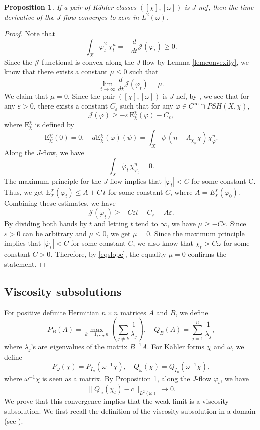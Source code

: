\documentclass{amsart}
\numberwithin{equation}{section}
\theoremstyle{plain}
\newtheorem{prop}[equation]{Proposition}
\theoremstyle{definition}
\theoremstyle{remark}
\begin{document}
\begin{prop}\label{propslope}
    If a pair of K{\"a}hler classes $([\chi],[\omega])$ is $J$-nef, then the time derivative of the $J$-flow converges to zero in $L^2(\omega)$.
\end{prop}
\begin{proof}
    Note that 
    \begin{equation}\label{eqslope}
        \int_X \dot{\varphi}_t^2 \, \chi_t^n= -\frac{d}{dt}\mathcal{J} (\varphi_t) \ge 0.
    \end{equation}
    Since the $\mathcal{J}$-functional is convex along the $J$-flow by Lemma \ref{lemconvexity}, we know that there exists a constant $\mu \le 0$ such that
    $$\lim_{t\rightarrow\infty}\frac{d}{dt}\mathcal{J}(\varphi_t) = \mu.$$
    We claim that $\mu =0.$ Since the pair $([\chi],[\omega])$ is $J$-nef, by \cite[Theorem 23]{SD}, we see that for any $\varepsilon>0$, there exists a constant $C_\varepsilon$ such that for any $\varphi \in C^\infty \cap PSH(X,\chi)$,
    $$\mathcal{J} (\varphi) \ge -\varepsilon \, \mathrm{E}^\chi_\chi(\varphi) - C_\varepsilon,$$
    where $\mathrm{E}^\chi_\chi$ is defined by
    $$\mathrm{E}^\chi_\chi(0)=0,\quad d\mathrm{E}^\chi_\chi(\varphi)(\psi)=\int_X \psi \, (n-\Lambda_{\chi_\varphi}\chi) \chi_\varphi^n.$$
    Along the $J$-flow, we have
    $$\int_X \dot{\varphi}_t \, \chi_{\varphi_t}^n=0.$$ 
    The maximum principle for the $J$-flow implies that
    $|\dot{\varphi}_t| < C$ 
    for some constant C. 
    Thus, we get
    $\mathrm{E}^\chi_\chi(\varphi_t) \le A+C \, t$ 
    for some constant $C$, where $A=E^\chi_\chi(\varphi_0)$.
    Combining these estimates, we have
    $$\mathcal{J}(\varphi_t) \ge - C \varepsilon t - C_\varepsilon-A\varepsilon.$$
    By dividing both hands by $t$ and letting $t$ tend to $\infty$, we have 
    $\mu \ge -C \varepsilon.$
    Since $\varepsilon>0$ can be arbitrary and $\mu \le 0$, we get $\mu =0.$ Since the maximum principle implies that $|\dot{\varphi_t}|<C$ for some constant $C$, we also know that 
    $\chi_t > C \omega$
    for some constant $C>0$.
    Therefore, by \eqref{eqslope}, the equality $\mu=0$ confirms the statement. 
\end{proof}

\subsection{Viscosity subsolutions}\label{secvsub}
For positive definite Hermitian $n \times n$ matrices $A$ and $B$, we define 
$$P_B(A) = \max_{k=1,\dots,n} \left(\sum_{j \neq k} \frac{1}{\lambda_j}\right), \quad 
Q_B(A) = \sum^n_{j=1} \frac{1}{\lambda_j},$$
where $\lambda_j$'s are eigenvalues of the matrix $B^{-1}A$.
For K{\"a}hler forms $\chi$ and $\omega$, we define
$$P_\omega(\chi) = P_{I_n}(\omega^{-1}\chi), \quad
Q_\omega(\chi) = Q_{I_n}(\omega^{-1}\chi),$$
where $\omega^{-1}\chi$ is seen as a matrix. By Proposition \ref{propslope}, along the $J$-flow $\varphi_t$, we have
$$\|Q_\omega(\chi_t)-c\|_{L^2(\omega)} \rightarrow 0.$$
We prove that this convergence implies that the weak limit is a viscosity subsolution. We first recall the definition of the viscosity subsolution in a domain (see \cite{CIL, DDT}).
\end{document}
